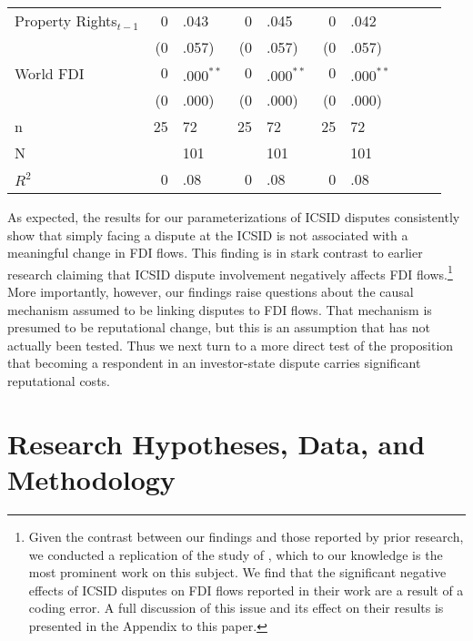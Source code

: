 \documentclass[12pt,onesided]{amsart}
\begin{document}
\begin{table}[ht]
{\begin{tabular}{lr@{} lr@{}lr@{}lr@{}lr@{}}
  Property Rights$_{t-1}$ & 0&.043 & 0&.045 & 0&.042 \\ 
   & (0&.057) & (0&.057) & (0&.057) \\ 
  World FDI & $0$&$.000^{\ast\ast}$ & $0$&$.000^{\ast\ast}$ & $0$&$.000^{\ast\ast}$ \\ 
   & (0&.000) & (0&.000) & (0&.000) \\ 
   \hline
n & 25&72 & 25&72 & 25&72 \\ 
  N && 101 && 101 && 101 \\ 
  $R^{2}$ & 0&.08 & 0&.08 & 0&.08 \\ 
   \hline
\hline
\end{tabular}
}
\end{table}

As expected, the results for our parameterizations of ICSID disputes consistently show that simply facing a dispute at the ICSID is not associated with a meaningful change in FDI flows. This finding is in stark contrast to earlier research claiming that ICSID dispute involvement negatively affects FDI flows.\footnote{Given the contrast between our findings and those reported by prior research, we conducted a replication of the study of \citet{allee:peinhardt:2011}, which to our knowledge is the most prominent work on this subject. We find that the significant negative effects of ICSID disputes on FDI flows reported in their work are a result of a coding error. A full discussion of this issue and its effect on their results is presented in the Appendix to this paper.} More importantly, however, our findings raise questions about the causal mechanism assumed to be linking disputes to FDI flows. That mechanism is presumed to be reputational change, but this is an assumption that has not actually been tested. Thus we next turn to a more direct test of the proposition that becoming a respondent in an investor-state dispute carries significant reputational costs.

\section*{Research Hypotheses, Data, and Methodology}
\end{document}
